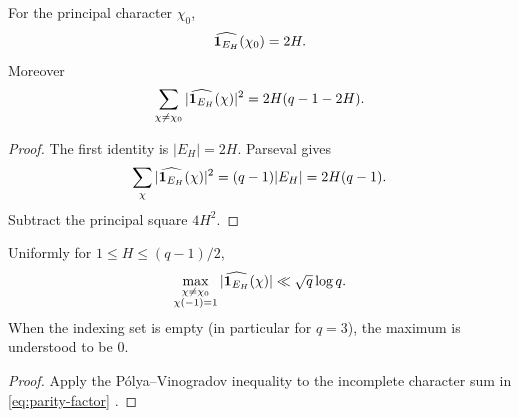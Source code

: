 \begin{proposition}
\label{prop:HS-ledger}
For the principal character \(\chi_0\),
\[
 \widehat{\mathbf 1_{E_H}}(\chi_0)=2H.
\]
Moreover
\begin{equation}
 \sum_{\chi\ne\chi_0}
 |\widehat{\mathbf 1_{E_H}}(\chi)|^2
 =
 2H(q-1-2H).
\label{eq:HS-ledger}
\end{equation}
\end{proposition}

\begin{proof}
The first identity is \(|E_H|=2H\).  Parseval gives
\[
 \sum_\chi|\widehat{\mathbf 1_{E_H}}(\chi)|^2
 =(q-1)|E_H|=2H(q-1).
\]
Subtract the principal square \(4H^2\).
\end{proof}

\begin{corollary}
\label{cor:PV-bound}
Uniformly for \(1\le H\le(q-1)/2\),
\[
 \max_{\substack{\chi\ne\chi_0\\\chi(-1)=1}}
 |\widehat{\mathbf 1_{E_H}}(\chi)|
 \ll\sqrt q\log q.
\]
When the indexing set is empty (in particular for \(q=3\)), the
maximum is understood to be \(0\).
\end{corollary}

\begin{proof}
Apply the P\'olya--Vinogradov inequality to the incomplete character
sum in \eqref{eq:parity-factor}
\citep[Chapter~12]{IK2004}.
\end{proof}
